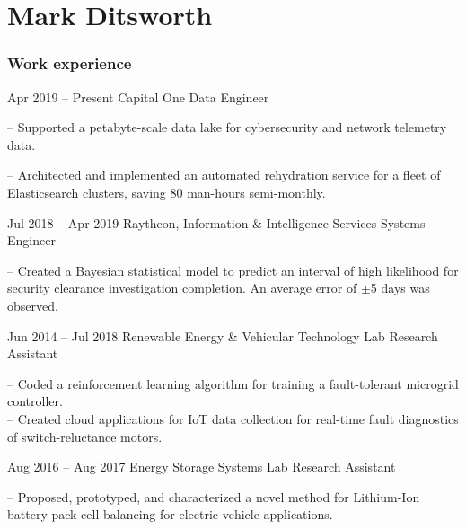 \documentclass{tccv}
\begin{document}
\part{Mark Ditsworth}

\section{Work experience}

\begin{eventlist}

\item{Apr 2019 -- Present}
    {Capital One}
    {Data Engineer}
    
-- Supported a petabyte-scale data lake for cybersecurity and network telemetry data.

-- Architected and implemented an automated rehydration service for a fleet of Elasticsearch clusters, saving 80 man-hours semi-monthly.

\item{Jul 2018 -- Apr 2019}
    {Raytheon, Information \& Intelligence Services}
    {Systems Engineer}
    
-- Created a Bayesian statistical model to predict an interval of high
likelihood for security clearance investigation completion. An average
error of $\pm$5 days was observed.

\item{Jun 2014 -- Jul 2018}
     {Renewable Energy \& Vehicular Technology Lab}
     {Research Assistant}

-- Coded a reinforcement learning algorithm for training a fault-tolerant
microgrid controller.\\
-- Created cloud applications for IoT data collection for real-time fault diagnostics of switch-reluctance motors.

\item{Aug 2016 -- Aug 2017}
     {Energy Storage Systems Lab}
     {Research Assistant}

-- Proposed, prototyped, and characterized a novel method for Lithium-Ion battery pack cell balancing for electric vehicle applications.

\end{eventlist}
\vspace{-12pt}
\end{document}

